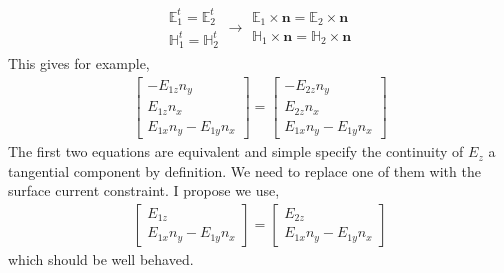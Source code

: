 \documentclass{article}
\newcommand{\n}{\mathbf{n}}
\newcommand{\0}{\varnothing}
\newcommand{\Ev}{\mathbb{E}}
\newcommand{\Hv}{\mathbb{H}}
\begin{document}
\begin{align*}
    \begin{array}{c}
    \Ev^t_{1} = \Ev^t_{2} \\
    \Hv^t_{1} = \Hv^t_{2} 
    \end{array}  \rightarrow
    \begin{array}{c}
    \Ev_1 \times \n = \Ev_2 \times \n\\ 
    \Hv_1 \times \n = \Hv_2 \times \n
    \end{array} 
\end{align*}
This gives for example,
\begin{align*}
    \left[
    \begin{array}{c}
    	- E_{1z} n_y\\
	    E_{1z} n_x \\
	    E_{1x} n_y - E_{1y} n_x
	\end{array}
	\right] = 
	   \left[
    \begin{array}{c}
    	- E_{2z} n_y\\
	    E_{2z} n_x \\
	    E_{1x} n_y - E_{1y} n_x
	\end{array}	
	\right]
\end{align*}
The first two equations are equivalent and simple specify the continuity of $E_z$ a tangential component by definition. We need to replace one of them with the surface current constraint. I propose we use,
\begin{align*}
    \left[
    \begin{array}{c}
	    E_{1z}\\
	    E_{1x} n_y - E_{1y} n_x
	\end{array}
	\right] = 
	   \left[
    \begin{array}{c}
	    E_{2z} \\
	    E_{1x} n_y - E_{1y} n_x
	\end{array}	
	\right]
\end{align*}
which should be well behaved.
\end{document}
